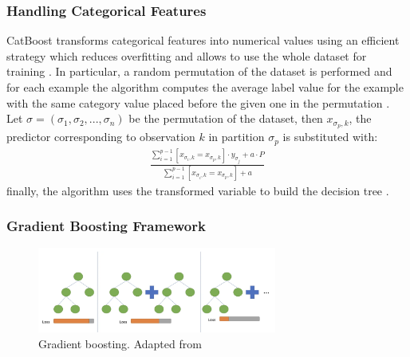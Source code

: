 \subsubsection{Handling Categorical Features}

CatBoost transforms categorical features into numerical values using an efficient strategy which reduces overfitting and allows to use the whole dataset for training \cite{dorogush2018catboost}. 
In particular, a random permutation of the dataset is performed and for each example the algorithm computes the average label value for the example with the same category value placed before the given one in the permutation \cite{dorogush2018catboost}. Let $\sigma = (\sigma_1, \sigma_2, ..., \sigma_n)$ be the permutation of the dataset, then $x_{\sigma_p, k}$, the predictor corresponding to observation $k$ in partition $\sigma_p$ is substituted with:
\begin{align}
    \frac{\sum_{i=1}^{p-1} [x_{\sigma_i, k} = x_{\sigma_p, k}] \cdot y_{\sigma_j} + a \cdot P }{\sum_{i=1}^{p-1} [x_{\sigma_i, k} = x_{\sigma_p, k}] + a}
\end{align}
\noindent finally, the algorithm uses the transformed variable to build the decision tree \cite{dorogush2018catboost}.

\subsubsection{Gradient Boosting Framework}

\begin{figure}[H]
    \centering
    \includegraphics[width=0.7\textwidth]{figures/gradient_boosting_v2.png}
    \caption{Gradient boosting. Adapted from \cite{Yenigun2022}}
    \label{fig:catboost}
\end{figure}

